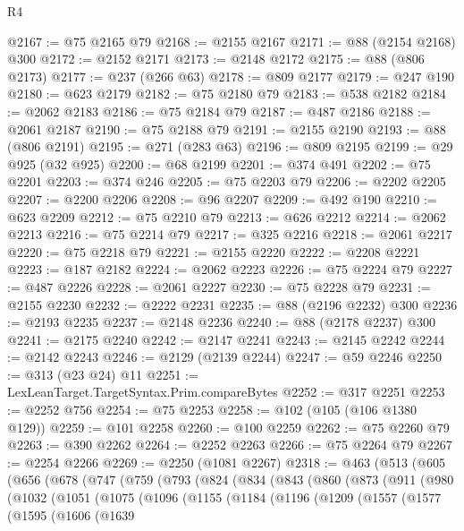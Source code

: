 \begin{lexlean}{R4}
\begin{coremodule}
@2167 := @75 @2165 @79
@2168 := @2155 @2167
@2171 := @88 (@2154 @2168) @300
@2172 := @2152 @2171
@2173 := @2148 @2172
@2175 := @88 (@806 @2173)
@2177 := @237 (@266 @63)
@2178 := @809 @2177
@2179 := @247 @190
@2180 := @623 @2179
@2182 := @75 @2180 @79
@2183 := @538 @2182
@2184 := @2062 @2183
@2186 := @75 @2184 @79
@2187 := @487 @2186
@2188 := @2061 @2187
@2190 := @75 @2188 @79
@2191 := @2155 @2190
@2193 := @88 (@806 @2191)
@2195 := @271 (@283 @63)
@2196 := @809 @2195
@2199 := @29 @925 (@32 @925)
@2200 := @68 @2199
@2201 := @374 @491
@2202 := @75 @2201
@2203 := @374 @246
@2205 := @75 @2203 @79
@2206 := @2202 @2205
@2207 := @2200 @2206
@2208 := @96 @2207
@2209 := @492 @190
@2210 := @623 @2209
@2212 := @75 @2210 @79
@2213 := @626 @2212
@2214 := @2062 @2213
@2216 := @75 @2214 @79
@2217 := @325 @2216
@2218 := @2061 @2217
@2220 := @75 @2218 @79
@2221 := @2155 @2220
@2222 := @2208 @2221
@2223 := @187 @2182
@2224 := @2062 @2223
@2226 := @75 @2224 @79
@2227 := @487 @2226
@2228 := @2061 @2227
@2230 := @75 @2228 @79
@2231 := @2155 @2230
@2232 := @2222 @2231
@2235 := @88 (@2196 @2232) @300
@2236 := @2193 @2235
@2237 := @2148 @2236
@2240 := @88 (@2178 @2237) @300
@2241 := @2175 @2240
@2242 := @2147 @2241
@2243 := @2145 @2242
@2244 := @2142 @2243
@2246 := @2129 (@2139 @2244)
@2247 := @59 @2246
@2250 := @313 (@23 @24) @11
@2251 := LexLeanTarget.TargetSyntax.Prim.compareBytes
@2252 := @317 @2251
@2253 := @2252 @756
@2254 := @75 @2253
@2258 := @102 (@105 (@106 @1380 @129))
@2259 := @101 @2258
@2260 := @100 @2259
@2262 := @75 @2260 @79
@2263 := @390 @2262
@2264 := @2252 @2263
@2266 := @75 @2264 @79
@2267 := @2254 @2266
@2269 := @2250 (@1081 @2267)
@2318 := @463
    (@513
      (@605
        (@656
          (@678
            (@747
              (@759
                (@793
                  (@824
                    (@834
                      (@843
                        (@860
                          (@873
                            (@911
                              (@980
                                (@1032
                                  (@1051
                                    (@1075
                                      (@1096
                                        (@1155
                                          (@1184
                                            (@1196
                                              (@1209
                                                (@1557
                                                  (@1577
                                                    (@1595
                                                      (@1606
                                                        (@1639

\end{coremodule}
\end{lexlean}
